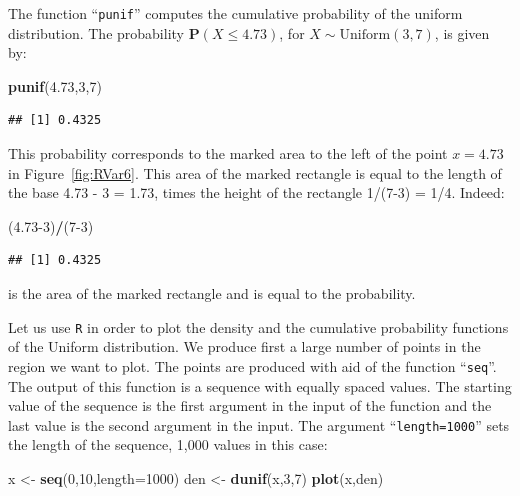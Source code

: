 \documentclass[
]{krantz}
\makeatletter
\newenvironment{Shaded}{\begin{snugshade}}{\end{snugshade}}
\newcommand{\DataTypeTok}[1]{\textcolor[rgb]{0.13,0.29,0.53}{#1}}
\newcommand{\DecValTok}[1]{\textcolor[rgb]{0.00,0.00,0.81}{#1}}
\newcommand{\FloatTok}[1]{\textcolor[rgb]{0.00,0.00,0.81}{#1}}
\newcommand{\KeywordTok}[1]{\textcolor[rgb]{0.13,0.29,0.53}{\textbf{#1}}}
\newcommand{\NormalTok}[1]{#1}
\newcommand{\OperatorTok}[1]{\textcolor[rgb]{0.81,0.36,0.00}{\textbf{#1}}}
\newcommand{\StringTok}[1]{\textcolor[rgb]{0.31,0.60,0.02}{#1}}
\newcommand{\Prob}{\mathbf{P}}
\newenvironment{kframe}{%
\medskip{}
\setlength{\fboxsep}{.8em}
 \def\at@end@of@kframe{}%
 \ifinner\ifhmode%
  \def\at@end@of@kframe{\end{minipage}}%
  \begin{minipage}{\columnwidth}%
 \fi\fi%
 \def\FrameCommand##1{\hskip\@totalleftmargin \hskip-\fboxsep
 \colorbox{shadecolor}{##1}\hskip-\fboxsep
     \hskip-\linewidth \hskip-\@totalleftmargin \hskip\columnwidth}%
 \MakeFramed {\advance\hsize-\width
   \@totalleftmargin\z@ \linewidth\hsize
   \@setminipage}}%
 {\par\unskip\endMakeFramed%
 \at@end@of@kframe}
\renewenvironment{Shaded}{\begin{kframe}}{\end{kframe}}
\theoremstyle{definition}
\theoremstyle{definition}
\theoremstyle{definition}
\theoremstyle{remark}
\makeatother
\begin{document}
The function ``\texttt{punif}'' computes the cumulative probability of the
uniform distribution. The probability \(\Prob(X \leq 4.73)\), for
\(X \sim \mathrm{Uniform}(3,7)\), is given by:

\begin{Shaded}
\begin{Highlighting}[]
\KeywordTok{punif}\NormalTok{(}\FloatTok{4.73}\NormalTok{,}\DecValTok{3}\NormalTok{,}\DecValTok{7}\NormalTok{)}
\end{Highlighting}
\end{Shaded}

\begin{verbatim}
## [1] 0.4325
\end{verbatim}

This probability corresponds to the marked area to the left of the point
\(x = 4.73\) in Figure~\ref{fig:RVar6}. This area of the marked
rectangle is equal to the length of the base 4.73 - 3 = 1.73, times the
height of the rectangle 1/(7-3) = 1/4. Indeed:

\begin{Shaded}
\begin{Highlighting}[]
\NormalTok{(}\FloatTok{4.73}\DecValTok{-3}\NormalTok{)}\OperatorTok{/}\NormalTok{(}\DecValTok{7-3}\NormalTok{)}
\end{Highlighting}
\end{Shaded}

\begin{verbatim}
## [1] 0.4325
\end{verbatim}

is the area of the marked rectangle and is equal to the probability.

Let us use \texttt{R} in order to plot the density and the cumulative
probability functions of the Uniform distribution. We produce first a
large number of points in the region we want to plot. The points are
produced with aid of the function ``\texttt{seq}''. The output of this function
is a sequence with equally spaced values. The starting value of the
sequence is the first argument in the input of the function and the last
value is the second argument in the input. The argument ``\texttt{length=1000}''
sets the length of the sequence, 1,000 values in this case:

\begin{Shaded}
\begin{Highlighting}[]
\NormalTok{x <-}\StringTok{ }\KeywordTok{seq}\NormalTok{(}\DecValTok{0}\NormalTok{,}\DecValTok{10}\NormalTok{,}\DataTypeTok{length=}\DecValTok{1000}\NormalTok{)}
\NormalTok{den <-}\StringTok{ }\KeywordTok{dunif}\NormalTok{(x,}\DecValTok{3}\NormalTok{,}\DecValTok{7}\NormalTok{)}
\KeywordTok{plot}\NormalTok{(x,den)}
\end{Highlighting}
\end{Shaded}
\end{document}
